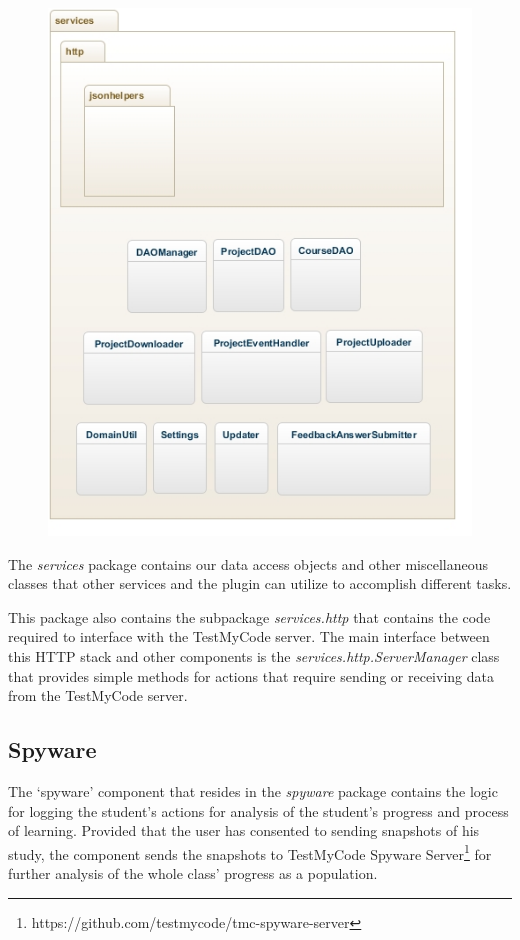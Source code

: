 \documentclass[12pt,a4paper,english,leqno]{article}
\begin{document}
\begin{figure}[ht!]
\centering
\includegraphics[scale=1]{img/services.jpg}
\end{figure}

The \textit{services} package contains our data access objects and other miscellaneous classes that other services and the plugin can utilize to accomplish different tasks.

This package also contains the subpackage \textit{services.http} that contains the code required to interface with the TestMyCode server. The main interface between this HTTP stack and other components is the \textit{services.http.ServerManager} class that provides simple methods for actions that require sending or receiving data from the TestMyCode server.

\subsection{Spyware}

The `spyware' component that resides in the \textit{spyware} package contains the logic for logging the student's actions for analysis of the student's progress and process of learning. Provided that the user has consented to sending snapshots of his study, the component sends the snapshots to TestMyCode Spyware Server\footnote{https://github.com/testmycode/tmc-spyware-server} for further analysis of the whole class' progress as a population.
\end{document}
